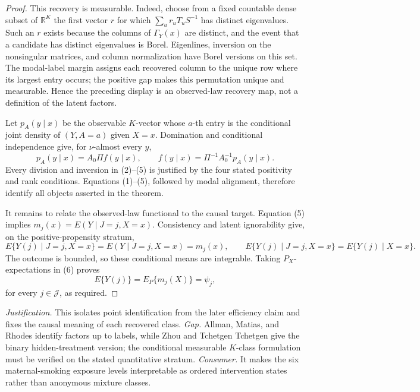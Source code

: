 \documentclass{article}
\begin{document}
\begin{proof}
This recovery is measurable.  Indeed, choose from a fixed countable dense subset of \(\mathbb R^K\) the first vector \(r\) for which \(\sum_u r_uT_uS^{-1}\) has distinct eigenvalues.  Such an \(r\) exists because the columns of \(\Gamma_Y(x)\) are distinct, and the event that a candidate has distinct eigenvalues is Borel.  Eigenlines, inversion on the nonsingular matrices, and column normalization have Borel versions on this set.  The modal-label margin assigns each recovered column to the unique row where its largest entry occurs; the positive gap makes this permutation unique and measurable.  Hence the preceding display is an observed-law recovery map, not a definition of the latent factors.

Let \(p_A(y\mid x)\) be the observable \(K\)-vector whose \(a\)-th entry is the conditional joint density of \((Y,A=a)\) given \(X=x\).  Domination and conditional independence give, for \(\nu\)-almost every \(y\),
\[
p_A(y\mid x)=A_0\Pi f(y\mid x),\qquad
f(y\mid x)=\Pi^{-1}A_0^{-1}p_A(y\mid x). \tag{5}
\]
Every division and inversion in (2)--(5) is justified by the four stated positivity and rank conditions.  Equations (1)--(5), followed by modal alignment, therefore identify all objects asserted in the theorem.

It remains to relate the observed-law functional to the causal target.  Equation (5) implies
\(m_j(x)=E(Y\mid J=j,X=x)\).  Consistency and latent ignorability give, on the positive-propensity stratum,
\[
E\{Y(j)\mid J=j,X=x\}=E(Y\mid J=j,X=x)=m_j(x),
\qquad
E\{Y(j)\mid J=j,X=x\}=E\{Y(j)\mid X=x\}. \tag{6}
\]
The outcome is bounded, so these conditional means are integrable.  Taking \(P_X\)-expectations in (6) proves
\[
E\{Y(j)\}=E_P\{m_j(X)\}=\psi_j,
\]
for every \(j\in\mathcal J\), as required.
\end{proof}
\par\smallskip\noindent \textit{Justification.} This isolates point identification from the later efficiency claim and fixes the causal meaning of each recovered class. \textit{Gap.} Allman, Matias, and Rhodes identify factors up to labels, while Zhou and Tchetgen Tchetgen give the binary hidden-treatment version; the conditional measurable \(K\)-class formulation must be verified on the stated quantitative stratum. \textit{Consumer.} It makes the six maternal-smoking exposure levels interpretable as ordered intervention states rather than anonymous mixture classes.
\end{document}
